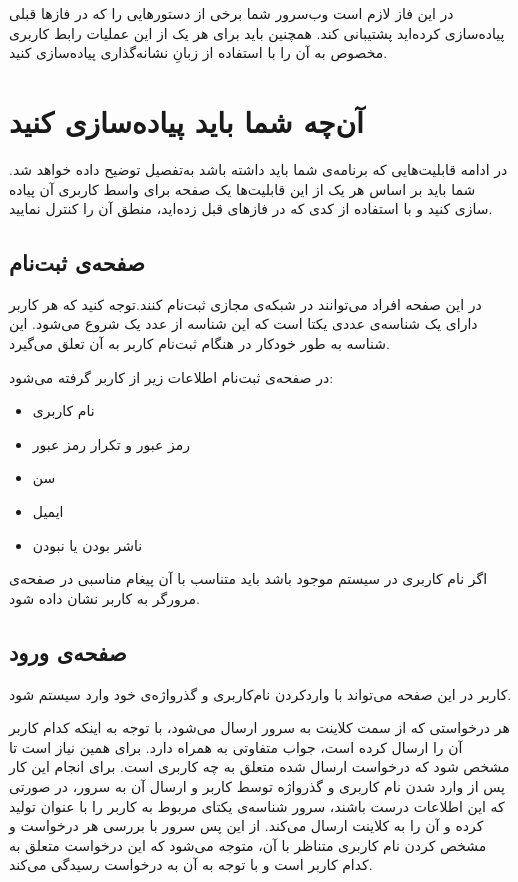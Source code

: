 \documentclass{utap}
\begin{document}
        در این فاز لازم است وب‌سرور شما برخی از دستورهایی را که در فازها قبلی پیادەسازی کردەاید پشتیبانی کند. همچنین باید برای هر یک از این عملیات رابط کاربری مخصوص به آن را با استفاده از زبانِ نشانه‌گذاری  پیادەسازی کنید.

    \section{آن‌چه‌ شما باید پیاده‌سازی کنید}
    
در ادامه قابلیت‌هایی که برنامه‌ی شما باید داشته باشد به‌تفصیل توضیح داده خواهد شد. شما باید بر اساس هر یک از این قابلیت‌ها یک صفحه برای واسط کاربری آن پیاده سازی کنید و با استفاده از کدی که در فازهای قبل زدەاید، منطق آن را کنترل نمایید.
    
    \subsection{صفحه‌ی ثبت‌نام}
    
    در این صفحه افراد می‌توانند در شبکه‌ی مجازی ثبت‌نام کنند.توجه کنید که هر کاربر دارای یک شناسه‌ی عددی یکتا است که این شناسه از عدد یک شروع می‌شود. این شناسه به طور خودکار در هنگام ثبت‌نام کاربر به آن تعلق می‌گیرد.  
    
    در صفحه‌ی ثبت‌نام اطلاعات زیر از کاربر گرفته می‌شود‌:‌
    \begin{multicols}{3}
    \begin{itemize}[noitemsep,nosep]
        \item نام ‌کاربری
        \item رمز عبور و تکرار رمز عبور
        \item سن
        \item ایمیل
        \item ناشر بودن یا نبودن
    \end{itemize}
    \end{multicols}
    
    اگر نام کاربری در سیستم موجود باشد باید متناسب با آن پیغام مناسبی در صفحه‌ی مرورگر به کاربر نشان داده شود.
    
        
    \subsection{صفحه‌ی ورود}
    کاربر در این صفحه می‌تواند با واردکردن نام‌کاربری و گذرواژەی خود وارد سیستم شود. 
    
    هر درخواستی که از سمت کلاینت به سرور ارسال می‌شود، با توجه به اینکه کدام کاربر آن را ارسال کرده است، جواب متفاوتی به همراه دارد. برای همین نیاز است تا مشخص شود که درخواست ارسال شده متعلق به چه کاربری است. برای انجام این کار پس از وارد شدن نام‌ کاربری و گذرواژه توسط کاربر و ارسال آن به سرور، در صورتی که این اطلاعات درست باشند، سرور شناسه‌ی یکتای مربوط به کاربر را با عنوان  تولید کرده و آن را به کلاینت ارسال می‌کند. از این پس سرور با بررسی  هر درخواست و مشخص کردن نام کاربری متناظر با آن، متوجه می‌شود که این درخواست متعلق به کدام کاربر است و با توجه به آن به درخواست رسیدگی می‌کند.
    
\end{document}
